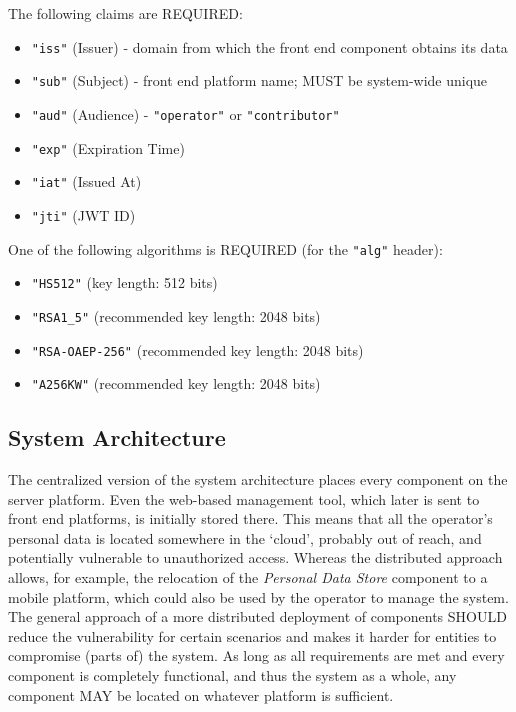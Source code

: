 \documentclass[12pt,english,a4paper,titlepage,cleardoublepage=empty,dottedtoc]{report}
\providecommand{\tightlist}{%
  \setlength{\itemsep}{0pt}\setlength{\parskip}{0pt}}
\begin{document}
The following claims are REQUIRED:

\begin{itemize}
\tightlist
\item
  \texttt{"iss"} (Issuer) - domain from which the front end component
  obtains its data
\item
  \texttt{"sub"} (Subject) - front end platform name; MUST be
  system-wide unique
\item
  \texttt{"aud"} (Audience) - \texttt{"operator"} or
  \texttt{"contributor"}
\item
  \texttt{"exp"} (Expiration Time)
\item
  \texttt{"iat"} (Issued At)
\item
  \texttt{"jti"} (JWT ID)
\end{itemize}

One of the following algorithms is REQUIRED (for the \texttt{"alg"}
header):

\begin{itemize}
\tightlist
\item
  \texttt{"HS512"} (key length: 512 bits)
\item
  \texttt{"RSA1\_5"} (recommended key length: 2048 bits)
\item
  \texttt{"RSA-OAEP-256"} (recommended key length: 2048 bits)
\item
  \texttt{"A256KW"} (recommended key length: 2048 bits)
\end{itemize}

\hypertarget{system-architecture}{\subsection{System
Architecture}\label{system-architecture}}

The centralized version of the system architecture places every
component on the server platform. Even the web-based management tool,
which later is sent to front end platforms, is initially stored there.
This means that all the operator's personal data is located somewhere in
the `cloud', probably out of reach, and potentially vulnerable to
unauthorized access. Whereas the distributed approach allows, for
example, the relocation of the \emph{Personal Data Store} component to a
mobile platform, which could also be used by the operator to manage the
system. The general approach of a more distributed deployment of
components SHOULD reduce the vulnerability for certain scenarios and
makes it harder for entities to compromise (parts of) the system. As
long as all requirements are met and every component is completely
functional, and thus the system as a whole, any component MAY be located
on whatever platform is sufficient.
\end{document}
